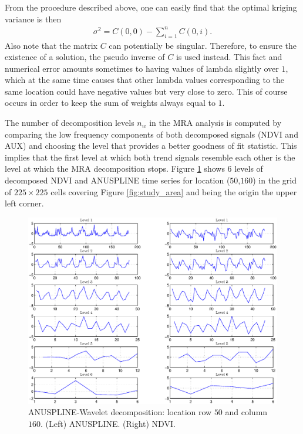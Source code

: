 \documentclass[10pt,letterpaper,conference]{ieeeconf}
\begin{document}
From the procedure described above, one can easily find that the optimal 
kriging variance is then 
\begin{align} \label{eq:krigingvarianceequation}
 \sigma^2 = C(0,0) -\sum_{i=1}^n C(0,i).
\end{align}
Also note that the matrix $C$ can potentially be singular. Therefore, to 
ensure the existence of a solution, the pseudo inverse of $C$ is used instead. 
This fact and numerical error amounts sometimes to having values of lambda 
slightly over $1$, which at the same time causes that other lambda values 
corresponding to the same location could have negative values but very close to 
zero. This of course occurs in order to keep the sum of weights always equal to 
$1$. 



The number of decomposition levels $n_w$ in the MRA analysis is computed by 
comparing the low frequency components of both decomposed signals (NDVI and AUX) 
and choosing the level that provides a better goodness of fit statistic. This 
implies that the first level at which both 
trend signals resemble each other is the level at which the MRA decomposition 
stops. Figure \ref{fig:level_decomposition1} shows $6$ levels of decomposed NDVI 
and ANUSPLINE time series for location ($50$,$160$) in the grid of $225\times 
225$ cells covering Figure \ref{fig:study_area} and being the origin the upper 
left corner.
\begin{figure}[ht]
\begin{center}
\includegraphics[width=\columnwidth]{point50_160}
\vspace*{-0.2in}
\caption{ANUSPLINE-Wavelet decomposition: location row $50$ and column $160$. 
(Left) ANUSPLINE. (Right) NDVI.}
\label{fig:level_decomposition1}
\end{center}
\end{figure}
\end{document}
